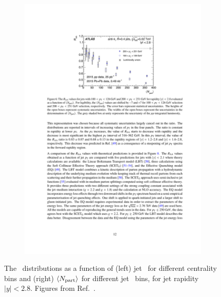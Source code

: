 \begin{figure}
\begin{subfigure}{.45\textwidth}
\includegraphics[width=\textwidth]{figures/jetMeasurements/raa_centDep}
\caption{}
\label{fig:raa_centDep_atlas}
\end{subfigure}
\caption{The \RAA\ distributions as a function of (left) jet \pt\ for different centrality bins and (right) $\langle \mbox{$N_{\mathrm{part}}$} \rangle$ for different jet \pt\ bins, for jet rapidity $|y| < 2.8$.
Figures from Ref.~\cite{2019108}.}
\label{fig:atlas_jet_raa}
\end{figure}

